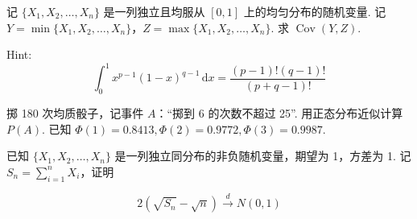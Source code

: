 \documentclass{ctexart}
\begin{document}
记 $\{X_1, X_2, \ldots, X_n\}$ 是一列独立且均服从 $[0,1]$ 上的均匀分布的随机变量. 记 $Y = \min\{X_1, X_2, \ldots, X_n\}$，$Z = \max\{X_1, X_2, \ldots, X_n\}$. 求 $\operatorname{Cov}(Y, Z)$.

Hint:
\[ \int_0^1 x^{p-1}(1-x)^{q-1}\,\mathrm{d}x = \frac{(p-1)!(q-1)!}{(p+q-1)!} \]

掷 180 次均质骰子，记事件 $A$：“掷到 6 的次数不超过 25”. 用正态分布近似计算 $P(A)$. 已知 $\Phi(1) = 0.8413, \Phi(2) = 0.9772, \Phi(3) = 0.9987$.

已知 $\{X_1, X_2, \ldots, X_n\} $ 是一列独立同分布的非负随机变量，期望为 1，方差为 1. 记 $S_n = \displaystyle\sum_{i=1}^n X_i$，证明

\[ 2\left(\sqrt{S_n} - \sqrt{n}\right) \xrightarrow{d} N(0, 1) \]
\end{document}
